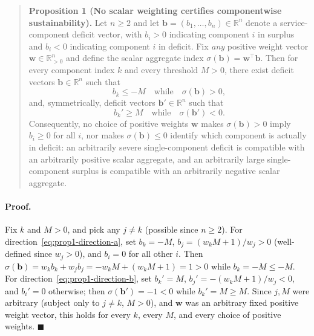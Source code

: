 \documentclass[twocolumn,10pt]{article}
\begin{document}
\begin{quote}
\textbf{Proposition 1 (No scalar weighting certifies componentwise sustainability).} Let $n\ge2$ and let $\mathbf b=(b_1,\dots,b_n)\in\mathbb R^n$ denote a service-component deficit vector, with $b_i>0$ indicating component $i$ in surplus and $b_i<0$ indicating component $i$ in deficit. Fix \emph{any} positive weight vector $\mathbf w\in\mathbb R^n_{>0}$ and define the scalar aggregate index $\sigma(\mathbf b)=\mathbf w^\top\mathbf b$. Then for every component index $k$ and every threshold $M>0$, there exist deficit vectors $\mathbf b\in\mathbb R^n$ such that
\begin{equation}
b_k \le -M \quad\text{while}\quad \sigma(\mathbf b) > 0, \label{eq:prop1-direction-a}
\end{equation}
and, symmetrically, deficit vectors $\mathbf b'\in\mathbb R^n$ such that
\begin{equation}
b_k' \ge M \quad\text{while}\quad \sigma(\mathbf b') < 0. \label{eq:prop1-direction-b}
\end{equation}
Consequently, no choice of positive weights $\mathbf w$ makes $\sigma(\mathbf b)>0$ imply $b_i\ge0$ for all $i$, nor makes $\sigma(\mathbf b)\le0$ identify which component is actually in deficit: an arbitrarily severe single-component deficit is compatible with an arbitrarily positive scalar aggregate, and an arbitrarily large single-component surplus is compatible with an arbitrarily negative scalar aggregate.
\end{quote}

\paragraph{Proof.} Fix $k$ and $M>0$, and pick any $j\ne k$ (possible since $n\ge2$). For direction~\eqref{eq:prop1-direction-a}, set $b_k=-M$, $b_j=(w_kM+1)/w_j>0$ (well-defined since $w_j>0$), and $b_i=0$ for all other $i$. Then $\sigma(\mathbf b)=w_kb_k+w_jb_j=-w_kM+(w_kM+1)=1>0$ while $b_k=-M\le-M$. For direction~\eqref{eq:prop1-direction-b}, set $b_k'=M$, $b_j'=-(w_kM+1)/w_j<0$, and $b_i'=0$ otherwise; then $\sigma(\mathbf b')=-1<0$ while $b_k'=M\ge M$. Since $j,M$ were arbitrary (subject only to $j\ne k$, $M>0$), and $\mathbf w$ was an arbitrary fixed positive weight vector, this holds for every $k$, every $M$, and every choice of positive weights. $\blacksquare$
\end{document}
